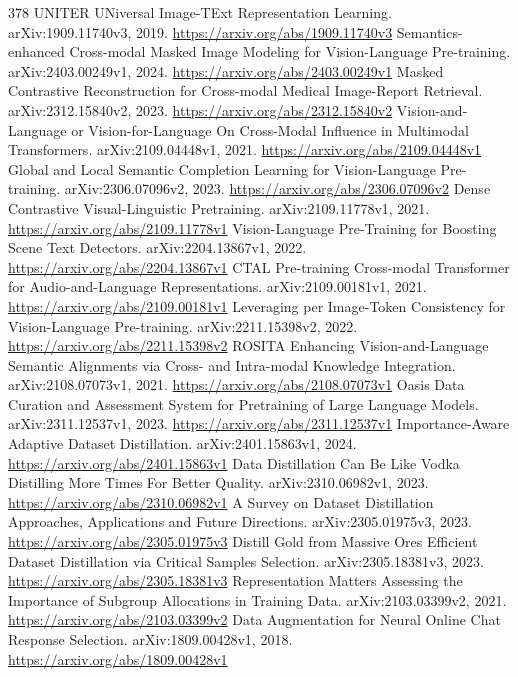 \documentclass[11pt]{article}
\begin{document}
\begin{thebibliography}{378}
 UNITER UNiversal Image-TExt Representation Learning. arXiv:1909.11740v3, 2019. \url{https://arxiv.org/abs/1909.11740v3}
 Semantics-enhanced Cross-modal Masked Image Modeling for Vision-Language Pre-training. arXiv:2403.00249v1, 2024. \url{https://arxiv.org/abs/2403.00249v1}
 Masked Contrastive Reconstruction for Cross-modal Medical Image-Report Retrieval. arXiv:2312.15840v2, 2023. \url{https://arxiv.org/abs/2312.15840v2}
 Vision-and-Language or Vision-for-Language On Cross-Modal Influence in Multimodal Transformers. arXiv:2109.04448v1, 2021. \url{https://arxiv.org/abs/2109.04448v1}
 Global and Local Semantic Completion Learning for Vision-Language Pre-training. arXiv:2306.07096v2, 2023. \url{https://arxiv.org/abs/2306.07096v2}
 Dense Contrastive Visual-Linguistic Pretraining. arXiv:2109.11778v1, 2021. \url{https://arxiv.org/abs/2109.11778v1}
 Vision-Language Pre-Training for Boosting Scene Text Detectors. arXiv:2204.13867v1, 2022. \url{https://arxiv.org/abs/2204.13867v1}
 CTAL Pre-training Cross-modal Transformer for Audio-and-Language Representations. arXiv:2109.00181v1, 2021. \url{https://arxiv.org/abs/2109.00181v1}
 Leveraging per Image-Token Consistency for Vision-Language Pre-training. arXiv:2211.15398v2, 2022. \url{https://arxiv.org/abs/2211.15398v2}
 ROSITA Enhancing Vision-and-Language Semantic Alignments via Cross- and Intra-modal Knowledge Integration. arXiv:2108.07073v1, 2021. \url{https://arxiv.org/abs/2108.07073v1}
 Oasis Data Curation and Assessment System for Pretraining of Large Language Models. arXiv:2311.12537v1, 2023. \url{https://arxiv.org/abs/2311.12537v1}
 Importance-Aware Adaptive Dataset Distillation. arXiv:2401.15863v1, 2024. \url{https://arxiv.org/abs/2401.15863v1}
 Data Distillation Can Be Like Vodka Distilling More Times For Better Quality. arXiv:2310.06982v1, 2023. \url{https://arxiv.org/abs/2310.06982v1}
 A Survey on Dataset Distillation Approaches, Applications and Future Directions. arXiv:2305.01975v3, 2023. \url{https://arxiv.org/abs/2305.01975v3}
 Distill Gold from Massive Ores Efficient Dataset Distillation via Critical Samples Selection. arXiv:2305.18381v3, 2023. \url{https://arxiv.org/abs/2305.18381v3}
 Representation Matters Assessing the Importance of Subgroup Allocations in Training Data. arXiv:2103.03399v2, 2021. \url{https://arxiv.org/abs/2103.03399v2}
 Data Augmentation for Neural Online Chat Response Selection. arXiv:1809.00428v1, 2018. \url{https://arxiv.org/abs/1809.00428v1}

\end{thebibliography}
\end{document}
